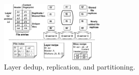 \begin{figure}[t]
	\centering
	\centering
	\includegraphics[width=0.45\textwidth]{graphs/replication.pdf}
	\caption{Layer dedup, replication, and partitioning.}
	\label{fig:replication-partition}
\end{figure}
